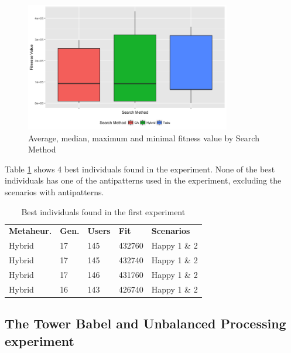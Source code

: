 \begin{figure}[h]
\begin{minipage}{.5\textwidth}
\centering
\includegraphics[width=0.8\textwidth]{./images/experiment1-4.png}
\caption{Average, median, maximum and minimal fitness value by Search Method}
\label{fig:boxplot1}
\end{minipage}
\end{figure}

Table \ref{tab:bestindividuals} shows 4 best individuals found in the experiment. None of the best individuals has one of the antipatterns used in the experiment, excluding the scenarios with antipatterns. 

\begin{table}[h]
\centering
\caption{Best individuals found in the first experiment}
\label{tab:bestindividuals}
\begin{tabular}{lllll}
\rowcolor[HTML]{C0C0C0} 
\textbf{Metaheur.} & \textbf{Gen.} & \textbf{Users} & \textbf{Fit} & \textbf{Scenarios}  \\
Hybrid & 17 & 145 & 432760 & Happy 1 \& 2  \\
Hybrid & 17 & 145 & 432740 & Happy 1 \& 2   \\
Hybrid & 17 & 146 & 431760 & Happy 1 \& 2  \\
Hybrid & 16 & 143 & 426740 & Happy 1 \& 2  
\end{tabular}
\end{table}


\vspace*{-.075in}
\subsection{The Tower Babel  and Unbalanced Processing experiment}
\vspace*{-.075in}

